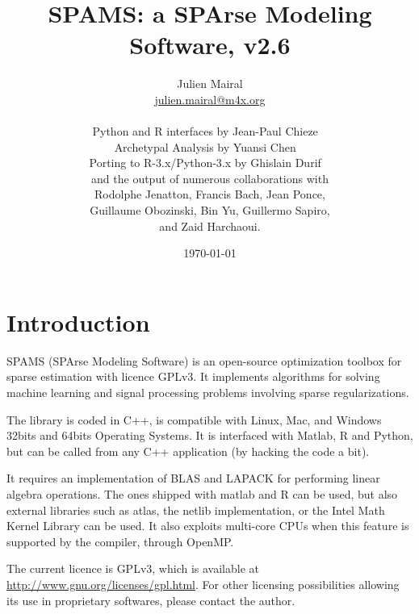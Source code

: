 \documentclass[a4paper, 11pt]{article}
\title{SPAMS: a SPArse Modeling Software, v2.6}
\date{\today}
\author{Julien Mairal \\
   \url{julien.mairal@m4x.org} \\
   ~\\
   Python and R interfaces by Jean-Paul Chieze
   ~\\
   Archetypal Analysis by Yuansi Chen
   ~\\
   Porting to R-3.x/Python-3.x by Ghislain Durif
   ~\\
   and the output of numerous collaborations with \\
   Rodolphe Jenatton, Francis Bach, Jean Ponce, \\ Guillaume Obozinski, Bin Yu, Guillermo Sapiro, \\ and Zaid
Harchaoui.  }
\begin{document}
\maketitle

\tableofcontents

\section{Introduction}
SPAMS (SPArse Modeling Software) is an open-source optimization toolbox for
sparse estimation with licence GPLv3.  It implements algorithms for solving
machine learning and signal processing problems involving sparse
regularizations.

The library is coded in C++, is compatible with Linux, Mac, and Windows 32bits
and 64bits Operating Systems. It is interfaced with Matlab, R and Python, but
can be called from any C++ application (by hacking the code a bit).

It requires an implementation of BLAS and LAPACK for performing linear algebra
operations. The ones shipped with matlab and R can be used, but also external
libraries such as atlas, the netlib implementation, or the Intel Math Kernel
Library can be used.  It also exploits multi-core CPUs when this feature is
supported by the compiler, through OpenMP.

The current licence is GPLv3, which is available at
\url{http://www.gnu.org/licenses/gpl.html}.  For other licensing possibilities
allowing its use in proprietary softwares, please contact the author.
\end{document}

